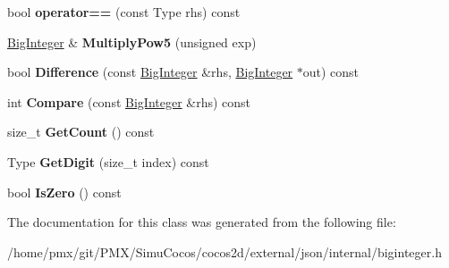 \begin{DoxyCompactItemize}
bool {\bfseries operator==} (const Type rhs) const
\item 
\mbox{\label{classinternal_1_1BigInteger_a98a13f169c27d1acfa57054f37c61763}} 
\hyperlink{classinternal_1_1BigInteger}{Big\+Integer} \& {\bfseries Multiply\+Pow5} (unsigned exp)
\item 
\mbox{\label{classinternal_1_1BigInteger_ad7ad62e6b62af38283ee940eb4015b26}} 
bool {\bfseries Difference} (const \hyperlink{classinternal_1_1BigInteger}{Big\+Integer} \&rhs, \hyperlink{classinternal_1_1BigInteger}{Big\+Integer} $\ast$out) const
\item 
\mbox{\label{classinternal_1_1BigInteger_af8e90fff5382de6c1cda5f751017200c}} 
int {\bfseries Compare} (const \hyperlink{classinternal_1_1BigInteger}{Big\+Integer} \&rhs) const
\item 
\mbox{\label{classinternal_1_1BigInteger_aa0ad6e74839b7c7fe77c9742ec079525}} 
size\+\_\+t {\bfseries Get\+Count} () const
\item 
\mbox{\label{classinternal_1_1BigInteger_a7288eefd49735c3c3edec698f56738bd}} 
Type {\bfseries Get\+Digit} (size\+\_\+t index) const
\item 
\mbox{\label{classinternal_1_1BigInteger_ae12dd6759f1f76501db3d1bcafce39cd}} 
bool {\bfseries Is\+Zero} () const
\end{DoxyCompactItemize}


The documentation for this class was generated from the following file\+:\begin{DoxyCompactItemize}
\item 
/home/pmx/git/\+P\+M\+X/\+Simu\+Cocos/cocos2d/external/json/internal/biginteger.\+h\end{DoxyCompactItemize}
